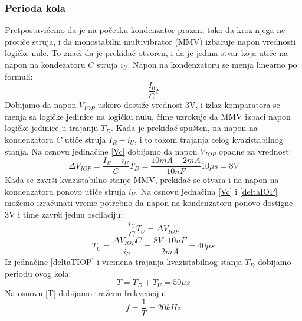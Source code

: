 \documentclass{article}
\begin{document}
                \subsubsection{Perioda kola}
                    Pretpostavićemo da je na početku kondenzator prazan, tako da kroz njega ne protiče struja, i da monostabilni multivibrator (MMV) izbacuje napon vrednosti logičke nule. To znači da je prekidač otvoren, i da je jedina stvar koja utiče na napon na kondezatoru $C$ struja $i_U$. Napon na kondenzatoru se menja linearno po formuli:
                    \begin{equation}
                        \label{Vc}
                        \frac{I_0}{C} t
                    \end{equation}
                    Dobijamo da napon $V_{IOP}$ uskoro dostiže vrednost 3V, i izlaz komparatora se menja sa logičke jedinice na logičku nulu, čime uzrokuje da MMV izbaci napon logičke jedinice u trajanju $T_D$. Kada je prekidač spušten, na napon na kondenzatoru $C$ utiče struja $I_R - i_U$, i to tokom trajanja celog kvazistabilnog stanja. Na osnovu jedinačine \eqref{Vc} dobijamo da napon $V_{IOP}$ opadne za vrednost:
                    \begin{equation}
                        \label{deltaIOP}
                        \Delta V_{IOP} = \frac{I_R - i_U}{C} T_D = \frac{10mA - 2mA}{10nF} 10\mu s = 8V
                    \end{equation}
                    Kada se završi kvazistabilno stanje MMV, prekidač se otvara i na napon na kondenzatoru ponovo utiče struja $i_U$. Na osnovu jednačina \eqref{Vc} i \eqref{deltaIOP} možemo izračunati vreme potrebno da napon na kondenzatoru ponovo dostigne 3V i time završi jednu oscilaciju:
                    $$\frac{i_U}{C} T_U = \Delta V_{IOP}$$
                    \begin{equation}
                        \label{deltaTIOP}
                        T_U = \frac{\Delta V_{IOP} C}{i_U} = \frac{8V \cdot 10nF}{2mA} = 40\mu s
                    \end{equation}
                    Iz jednačine \eqref{deltaTIOP} i vremena trajanja kvazistabilnog stanja $T_D$ dobijamo periodu ovog kola:
                    \begin{equation}
                        \label{T}
                        T = T_D + T_U = 50\mu s
                    \end{equation}
                    Na osnovu \eqref{T} dobijamo traženu frekvenciju:
                    $$f = \frac{1}{T} = 20kHz$$
\end{document}

